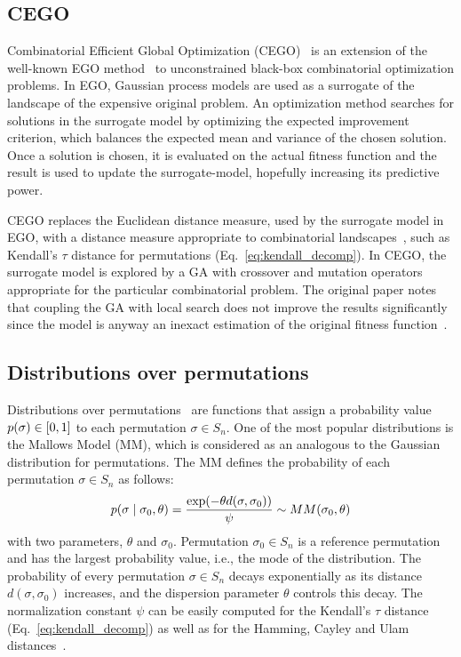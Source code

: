 \documentclass[runningheads]{llncs}
\begin{document}
\subsection{CEGO}

Combinatorial Efficient Global Optimization
(CEGO)~\citep{ZaeStoFriFisNauBar2014} is an extension of the well-known EGO
method~\citep{JonSchWel98go} to unconstrained black-box combinatorial
optimization problems. In EGO, Gaussian process models are used as a surrogate
of the landscape of the expensive original problem. An optimization method
searches for solutions in the surrogate model by optimizing the expected
improvement criterion, which balances the expected mean and variance of the
chosen solution. Once a solution is chosen, it is evaluated on the actual
fitness function and the result is used to update the surrogate-model,
hopefully increasing its predictive power.

CEGO replaces the Euclidean distance measure, used by the surrogate model in
EGO, with a distance measure appropriate to combinatorial
landscapes~\citep{ZaeStoBar2014:ppsn}, such as Kendall's $\tau$ distance for
permutations (Eq.~\ref{eq:kendall_decomp}). In CEGO, the surrogate model is explored by a GA with
crossover and mutation operators appropriate for the particular combinatorial
problem. The original paper notes that coupling the GA with local search does
not improve the results significantly since the model is anyway an inexact
estimation of the original fitness
function~\citep[p.~875]{ZaeStoFriFisNauBar2014}.


\subsection{Distributions over permutations}
Distributions over permutations~\cite{critchlow91} are functions that assign a probability value  $p(\sigma)\in[0,1]$ to each permutation $\sigma \in S_n$. One of the most popular distributions is the Mallows Model (MM), which is considered as an analogous to the Gaussian distribution for permutations. The MM defines the probability of each permutation $\sigma\in S_n$ as follows:
%
\begin{equation}\label{eq:MM}
p(\sigma \mid \sigma_0, \theta )= \frac{\exp(-\theta d(\sigma, \sigma_0))}{\psi} \sim MM(\sigma_0, \theta)
\end{equation}
%
with two parameters, $\theta$ and $\sigma_0$. Permutation $\sigma_0\in S_n$ is a reference permutation and has the largest probability value, i.e., the mode of the distribution. The probability of every permutation $\sigma\in S_n$ decays exponentially as its distance $d(\sigma,\sigma_0)$ increases, and the dispersion parameter $\theta$  controls this decay.  The normalization constant $\psi$ can be easily computed for the Kendall's $\tau$ distance (Eq.~\ref{eq:kendall_decomp}) as well as for the Hamming, Cayley and Ulam distances~\cite{IruCalLoz2016permallows}.
\end{document}
